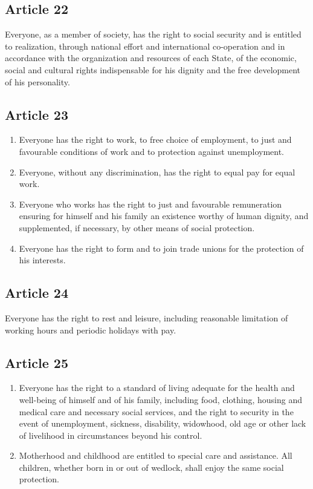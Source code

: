\documentclass[
  titlepage,
  openright,
  DIV=calc,
  toc=listof,
  listof=nochaptergap]{scrbook}
\begin{document}
\hypertarget{article-22-1}{%
\subsection{Article 22}\label{article-22-1}}

Everyone, as a member of society, has the right to social security and
is entitled to realization, through national effort and international
co-operation and in accordance with the organization and resources of
each State, of the economic, social and cultural rights indispensable
for his dignity and the free development of his personality.

\hypertarget{article-23-1}{%
\subsection{Article 23}\label{article-23-1}}

\begin{enumerate}
\def\labelenumi{\arabic{enumi}.}
\item
  Everyone has the right to work, to free choice of employment, to just
  and favourable conditions of work and to protection against
  unemployment.
\item
  Everyone, without any discrimination, has the right to equal pay for
  equal work.
\item
  Everyone who works has the right to just and favourable remuneration
  ensuring for himself and his family an existence worthy of human
  dignity, and supplemented, if necessary, by other means of social
  protection.
\item
  Everyone has the right to form and to join trade unions for the
  protection of his interests.
\end{enumerate}

\hypertarget{article-24-1}{%
\subsection{Article 24}\label{article-24-1}}

Everyone has the right to rest and leisure, including reasonable
limitation of working hours and periodic holidays with pay.

\hypertarget{article-25-1}{%
\subsection{Article 25}\label{article-25-1}}

\begin{enumerate}
\def\labelenumi{\arabic{enumi}.}
\item
  Everyone has the right to a standard of living adequate for the health
  and well-being of himself and of his family, including food, clothing,
  housing and medical care and necessary social services, and the right
  to security in the event of unemployment, sickness, disability,
  widowhood, old age or other lack of livelihood in circumstances beyond
  his control.
\item
  Motherhood and childhood are entitled to special care and assistance.
  All children, whether born in or out of wedlock, shall enjoy the same
  social protection.
\end{enumerate}
\end{document}
